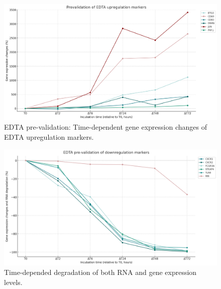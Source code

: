 \documentclass[fleqn,10pt]{wlscirep}
\begin{document}
\begin{figure}[ht]
    \centering
    \includegraphics[width=\linewidth]{figure2}
    \caption{EDTA pre-validation: Time-dependent gene expression changes of EDTA upregulation markers.}
    \label{fig:figure2}
    \end{figure}

\begin{figure}[ht]
    \centering
    \includegraphics[width=\linewidth]{figure3}
    \caption{Time-depended degradation of both RNA and gene expression levels.}
    \label{fig:figure3}
    \end{figure}
\end{document}

